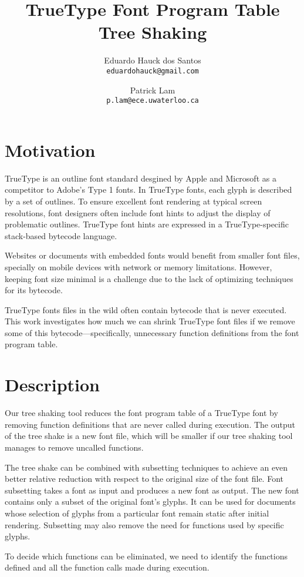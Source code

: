 \documentclass[12pt]{article}
\title{TrueType Font Program Table Tree Shaking}
\author{
  Eduardo Hauck dos Santos\\
  \texttt{eduardohauck@gmail.com}
  \and
  Patrick Lam\\
  \texttt{p.lam@ece.uwaterloo.ca}
}
\begin{document}
\maketitle

\section{Motivation}
TrueType is an outline font standard desgined by Apple and Microsoft as
a competitor to Adobe's Type 1 fonts. In TrueType fonts, each glyph is
described by a set of outlines. To ensure excellent font rendering at typical
screen resolutions, font designers often include font hints to adjust the display of
problematic outlines. TrueType font hints are expressed in a TrueType-specific
stack-based bytecode language.

Websites or documents with embedded fonts would benefit
from smaller font files, specially on mobile devices with network or
memory limitations. However, keeping
font size minimal is a challenge due to the lack of optimizing techniques
for its bytecode. 

TrueType fonts files in the wild often contain bytecode that is never
executed. This work investigates how much we can shrink TrueType font
files if we remove some of this bytecode---specifically, unnecessary
function definitions from the font program table.

\section{Description}

Our tree shaking tool reduces the font program table of a
TrueType font by removing function definitions that are never called
during execution. The output of the tree shake is a new font file, which will be
smaller if our tree shaking tool manages to remove uncalled functions.

The tree shake can be combined with subsetting techniques to achieve an
even better relative reduction with respect to the original size of the font file. Font
subsetting takes a font as input and produces a new font as output. The new font
contains only a subset of the original font's glyphs. It can be used
for documents whose selection of glyphs from a particular font remain static after
initial rendering. Subsetting may also remove the need for functions
used by specific glyphs.

To decide which functions can be eliminated, we need to identify the
functions defined and all the function calls made during execution.
\end{document}
